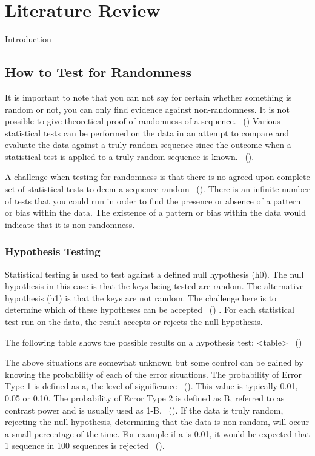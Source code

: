 \section{Literature Review}

Introduction

\subsection{How to Test for Randomness}

It is important to note that you can not say for certain whether something is random or not, you can only find evidence against non-randomness. It is not possible to give theoretical proof of randomness of a sequence. ~(\cite{55555}) Various statistical tests can be performed on the data in an attempt to compare and evaluate the data against a truly random sequence since the outcome when a statistical test is applied to a truly random sequence is known. ~(\cite{1195701}). \newline

A challenge when testing for randomness is that there is no agreed upon complete set of statistical tests to deem a sequence random ~(\cite{1195701}). There is an infinite number of tests that you could run in order to find the presence or absence of a pattern or bias within the data. The existence of a pattern or bias within the data would indicate that it is non randomness. \newline


\subsubsection{Hypothesis Testing}

Statistical testing is used to test against a defined null hypothesis (h0). The null hypothesis in this case is that the keys being tested are random. The alternative hypothesis (h1) is that the keys are not random. The challenge here is to determine which of these hypotheses can be accepted ~(\cite{10.1145/3447773}) . For each statistical test run on the data, the result accepts or rejects the null hypothesis. \newline

The following table shows the possible results on a hypothesis test:
 <table> ~(\cite{1195701}) \newline

The above situations are somewhat unknown but some control can be gained by knowing the probability of each of the error situations. The probability of Error Type 1 is defined as a, the level of significance ~(\cite{10.1145/3447773}). This value is typically 0.01, 0.05 or 0.10. The probability of Error Type 2 is defined as B, referred to as contrast power and is usually used as 1-B. ~(\cite{10.1145/3447773}). If the data is truly random, rejecting the null hypothesis, determining that the data is non-random, will occur a small percentage of the time. For example if a is 0.01, it would be expected that 1 sequence in 100 sequences is rejected ~(\cite{1195701}). \newline

